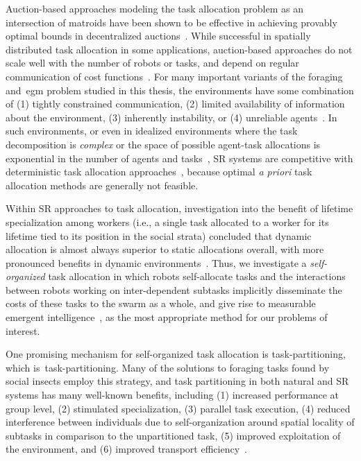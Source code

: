 Auction-based approaches modeling the task allocation problem as an intersection
of matroids have been shown to be effective in achieving provably optimal bounds
in decentralized auctions~\cite{Williams2017}. While successful in spatially
distributed task allocation in some applications, auction-based approaches do
not scale well with the number of robots or tasks, and depend on regular
communication of cost functions~\cite{Hsieh2008}. For many important variants of
the foraging and~\gls{egm} problem studied in this thesis, the environments have
some combination of (1) tightly constrained communication, (2) limited
availability of information about the environment, (3) inherently instability,
or (4) unreliable agents~\cite{Rouff2007a,Napp2014a}.  In such environments, or
even in idealized environments where the task decomposition is \emph{complex} or
the space of possible agent-task allocations is exponential in the number of
agents and tasks~\cite{Korsah2013}, SR systems are competitive with
deterministic task allocation approaches~\cite{Correll2008}, because optimal
\emph{a priori} task allocation methods are generally not feasible.

Within SR approaches to task allocation, investigation into the benefit of
lifetime specialization among workers (i.e., a single task allocated to a worker
for its lifetime tied to its position in the social strata) concluded that
dynamic allocation is almost always superior to static allocations overall, with
more pronounced benefits in dynamic environments~\cite{Ferrante2015}.
Thus, we investigate a \emph{self-organized} task allocation in which robots
self-allocate tasks and the interactions between robots working on
inter-dependent subtasks implicitly disseminate the costs of these tasks to the
swarm as a whole, and give rise to measurable emergent
intelligence~\cite{Harwell2019a},  as the most appropriate method for our
problems of interest.

%
One promising mechanism for self-organized task allocation is
\gls{task-partitioning}, which is~\glsdesc{task-partitioning}. Many of the
solutions to foraging tasks found by social insects employ this strategy, and
task partitioning in both natural and SR systems has many well-known benefits,
including (1) increased performance at group level, (2) stimulated
specialization, (3) parallel task execution, (4) reduced interference between
individuals due to self-organization around spatial locality of subtasks in
comparison to the unpartitioned task, (5) improved exploitation of the
environment, and (6) improved transport
efficiency~\cite{Hart2002,Pini2011b,Pini2011a}.

